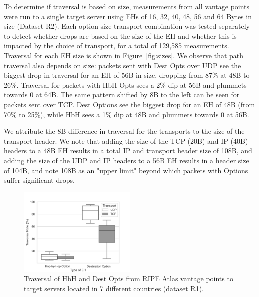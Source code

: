 \documentclass[conference]{IEEEtran}
\begin{document}
To determine if traversal is based on size, measurements from all vantage points were run to a single target server using EHs of 16, 32, 40, 48, 56 and 64 Bytes in size (Dataset R2). Each option-size-transport combination was tested separately to detect whether drops are based on the size of the EH and whether this is impacted by the choice of transport, for a total of 129,585 measurements.
Traversal for each EH size is shown in Figure~\ref{fig:sizes}. We observe that path traversal also depends on size: packets sent with Dest Opts over UDP see the biggest drop in traversal for an EH of 56B in size, dropping from 87\% at 48B to 26\%. Traversal for packets with HbH Opts sees a 2\% dip at 56B and plummets towards 0 at 64B.
The same pattern shifted by 8B to the left can be seen for packets sent over TCP. Dest Options see the biggest drop for an EH of 48B (from 70\% to 25\%), while HbH sees a 1\% dip at 48B and plummets towards 0 at 56B.

We attribute the 8B difference in traversal for the transports to the size of the transport header.
We note that adding the size of the TCP (20B) and IP (40B) headers to a 48B EH results in a total IP and transport header size of 108B, and adding the size of the UDP and IP headers to a 56B EH results in a header size of 104B, and note 108B as an "upper limit" beyond which packets with Options suffer significant drops.

\begin{figure}
\centering
  \includegraphics[width=0.5\textwidth]{all_traversal.png}
  \caption{Traversal of HbH and Dest Opts from RIPE Atlas vantage points to target servers located in 7 different countries (dataset R1). }
  \label{fig:countrybox}
\end{figure}
\end{document}
